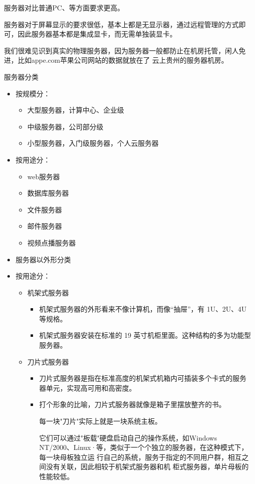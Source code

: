 服务器对比普通PC、等方面要求更高。

服务器对于屏幕显示的要求很低，基本上都是无显示器，通过远程管理的方式即可，因此服务器基本都是集成显卡，而无需单独装显卡。

我们很难见识到真实的物理服务器，因为服务器一般都防止在机房托管，闲人免进，比如appe.com苹果公司网站的数据就放在了 云上贵州的服务器机房。
\begin{ascolorbox11}{服务器分类}
\begin{itemize}
\item 按规模分：
	\begin{itemize}
		\item 大型服务器，计算中心、企业级
		\item 中级服务器，公司部分级
		\item 小型服务器，入门级服务器，个人云服务器
	\end{itemize}
\item 按用途分：
	\begin{itemize}
	\item web服务器
	\item 数据库服务器
	\item 文件服务器
	\item 邮件服务器
	\item 视频点播服务器
\end{itemize}
\item 服务器以外形分类
\item 按用途分：
\begin{itemize}
	\item 机架式服务器
	\begin{itemize}
		\item 机架式服务器的外形看来不像计算机，而像“抽屉”，有 1U、2U、4U 等规格。
		\item 机架式服务器安装在标准的 19 英寸机柜里面。这种结构的多为功能型服务器。
	\end{itemize}
	\item 刀片式服务器
		\begin{itemize}
		\item 刀片式服务器是指在标准高度的机架式机箱内可插装多个卡式的服务器单元，实现高可用和高密度。
		\item 打个形象的比喻，刀片式服务器就像是箱子里摆放整齐的书。
		
		每一块"刀片"实际上就是一块系统主板。
		
		它们可以通过"板载"硬盘启动自己的操作系统，如Windows NT/2000、Linux·等，类似于一个个独立的服务器，在这种模式下，每一块母板独立运 行自己的系统，服务于指定的不同用户群，相互之间没有关联，因此相较于机架式服务器和机 柜式服务器，单片母板的性能较低。
		

\end{itemize}
\end{itemize}
\end{itemize}
\end{ascolorbox11}
